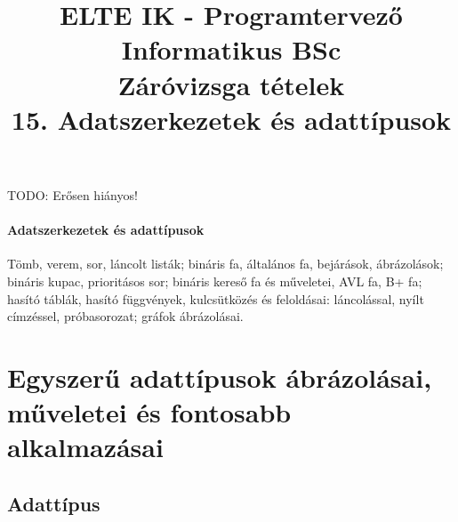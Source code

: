 \documentclass[margin=0px]{article}
\title{\textbf{{\Large ELTE IK - Programtervező Informatikus BSc} \vspace{0.2cm} \\ {\huge Záróvizsga tételek}} \vspace{0.3cm} \\ 15. Adatszerkezetek és adattípusok}
\author{}
\date{}
\newenvironment{tetel}[1]{\paragraph{#1 \\}}{}
\begin{document}
\maketitle

TODO: Erősen hiányos!

\begin{tetel}{Adatszerkezetek és adattípusok}
    Tömb, verem, sor, láncolt listák; bináris fa, általános fa, bejárások, ábrázolások; bináris kupac, prioritásos sor; bináris kereső fa és műveletei, AVL fa, B+ fa; hasító táblák, hasító függvények, kulcsütközés és feloldásai: láncolással, nyílt címzéssel, próbasorozat; gráfok ábrázolásai.
\end{tetel}

\section{Egyszerű adattípusok ábrázolásai, műveletei és fontosabb alkalmazásai}

\subsection{Adattípus}
\end{document}
